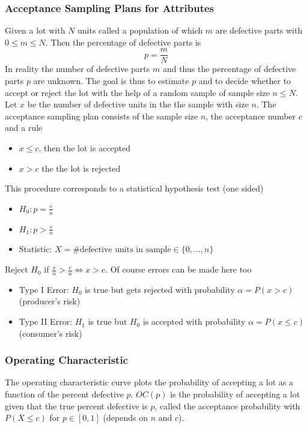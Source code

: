 \documentclass[11pt]{article}
\theoremstyle{definition}
\begin{document}
\subsubsection{Acceptance Sampling Plans for Attributes}
Given a lot with $N$ units called a population of which $m$ are defective parts with $0\leq m\leq N$. Then the percentage of defective parts is
\begin{equation*}
	p = \frac{m}{N}
\end{equation*}
In reality the number of defective parts $m$ and thus the percentage of defective parts $p$ are unknown. The goal is thus to estimate $p$ and to decide whether to accept or reject the lot with the help of a random sample of sample size $n\leq N$. Let $x$ be the number of defective units in the the sample with size $n$.
The acceptance sampling plan consists of the sample size $n$, the acceptance number $c$ and a rule
\begin{itemize}[nosep]
	\item $x\leq c$, then the lot is accepted
	\item $x>c$ the the lot is rejected
\end{itemize}
This procedure corresponds to a statistical hypothesis test (one sided)
\begin{itemize}
	\item $H_0: p=\frac{c}{n}$
	\item $H_1: p>\frac{c}{n}$
	\item Statistic: $X = \#\text{defective units in sample}\in\{0,\dots,n\}$
\end{itemize}
Reject $H_0$ if $\frac{x}{n}>\frac{c}{n}\Leftrightarrow x>c$. Of course errors can be made here too
\begin{itemize}
	\item Type I Error: $H_0$ is true but gets rejected with probability $\alpha = P(x>c)$ (producer's risk)
	\item Type II Error: $H_1$ is true but $H_0$ is accepted with probability $\alpha = P(x\leq c)$ (consumer's risk)
\end{itemize}


\subsubsection{Operating Characteristic}
The operating characteristic curve plots the probability of accepting a lot as a function of the percent defective $p$. $OC(p)$ is the probability of accepting a lot given that the true percent defective is $p$, called the acceptance probability with $P(X\leq c)$ for $p\in[0,1]$ (depends on $n$ and $c$).
\end{document}
